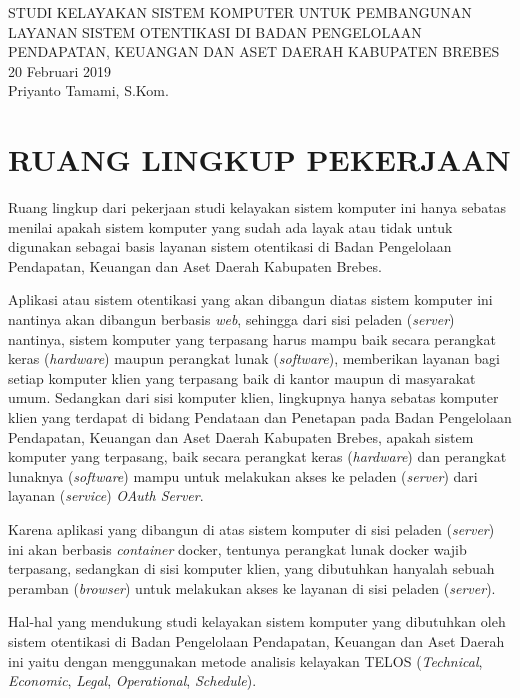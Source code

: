 \documentclass[pdftex,12pt, oneside]{article}
\begin{document}
%
\begin{center}
{\large STUDI KELAYAKAN SISTEM KOMPUTER UNTUK PEMBANGUNAN LAYANAN SISTEM OTENTIKASI DI BADAN PENGELOLAAN PENDAPATAN, KEUANGAN DAN ASET DAERAH KABUPATEN BREBES}
\\[1cm]
20 Februari 2019\\
Priyanto Tamami, S.Kom.
\end{center}

\section{RUANG LINGKUP PEKERJAAN}

Ruang lingkup dari pekerjaan studi kelayakan sistem komputer ini hanya sebatas menilai apakah sistem komputer yang sudah ada layak atau tidak untuk digunakan sebagai basis layanan sistem otentikasi di Badan Pengelolaan Pendapatan, Keuangan dan Aset Daerah Kabupaten Brebes.

Aplikasi atau sistem otentikasi yang akan dibangun diatas sistem komputer ini nantinya akan dibangun berbasis \textit{web}, sehingga dari sisi peladen (\textit{server}) nantinya, sistem komputer yang terpasang harus mampu baik secara perangkat keras (\textit{hardware}) maupun perangkat lunak (\textit{software}), memberikan layanan bagi setiap komputer klien yang terpasang baik di kantor maupun di masyarakat umum. Sedangkan dari sisi komputer klien, lingkupnya hanya sebatas komputer klien yang terdapat di bidang Pendataan dan Penetapan pada Badan Pengelolaan Pendapatan, Keuangan dan Aset Daerah Kabupaten Brebes, apakah sistem komputer yang terpasang, baik secara perangkat keras (\textit{hardware}) dan perangkat lunaknya (\textit{software}) mampu untuk melakukan akses ke peladen (\textit{server}) dari layanan (\textit{service}) \textit{OAuth Server}.

Karena aplikasi yang dibangun di atas sistem komputer di sisi peladen (\textit{server}) ini akan berbasis \textit{container} docker, tentunya perangkat lunak docker wajib terpasang, sedangkan di sisi komputer klien, yang dibutuhkan hanyalah sebuah peramban (\textit{browser}) untuk melakukan akses ke layanan di sisi peladen (\textit{server}).

Hal-hal yang mendukung studi kelayakan sistem komputer yang dibutuhkan oleh sistem otentikasi di Badan Pengelolaan Pendapatan, Keuangan dan Aset Daerah ini yaitu dengan menggunakan metode analisis kelayakan TELOS (\textit{Technical}, \textit{Economic}, \textit{Legal}, \textit{Operational}, \textit{Schedule}).
\end{document}
